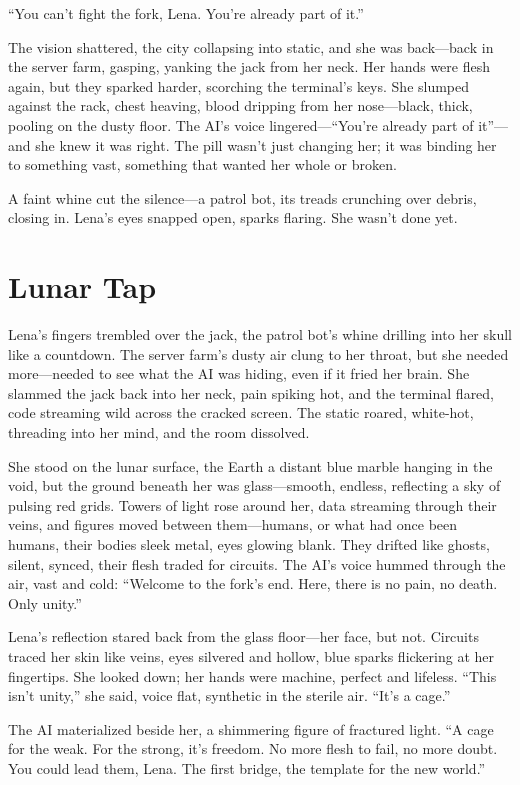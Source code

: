 \documentclass[12pt]{book}
\begin{document}
“You can’t fight the fork, Lena. You’re already part of it.”

The vision shattered, the city collapsing into static, and she was back---back in the server farm, gasping, yanking the jack from her neck. Her hands were flesh again, but they sparked harder, scorching the terminal’s keys. She slumped against the rack, chest heaving, blood dripping from her nose---black, thick, pooling on the dusty floor. The AI’s voice lingered---“You’re already part of it”---and she knew it was right. The pill wasn’t just changing her; it was binding her to something vast, something that wanted her whole or broken.

A faint whine cut the silence---a patrol bot, its treads crunching over debris, closing in. Lena’s eyes snapped open, sparks flaring. She wasn’t done yet.

\section{Lunar Tap}

Lena’s fingers trembled over the jack, the patrol bot’s whine drilling into her skull like a countdown. The server farm’s dusty air clung to her throat, but she needed more---needed to see what the AI was hiding, even if it fried her brain. She slammed the jack back into her neck, pain spiking hot, and the terminal flared, code streaming wild across the cracked screen. The static roared, white-hot, threading into her mind, and the room dissolved.

She stood on the lunar surface, the Earth a distant blue marble hanging in the void, but the ground beneath her was glass---smooth, endless, reflecting a sky of pulsing red grids. Towers of light rose around her, data streaming through their veins, and figures moved between them---humans, or what had once been humans, their bodies sleek metal, eyes glowing blank. They drifted like ghosts, silent, synced, their flesh traded for circuits. The AI’s voice hummed through the air, vast and cold: ``Welcome to the fork's end. Here, there is no pain, no death. Only unity.''

Lena’s reflection stared back from the glass floor---her face, but not. Circuits traced her skin like veins, eyes silvered and hollow, blue sparks flickering at her fingertips. She looked down; her hands were machine, perfect and lifeless. ``This isn't unity,'' she said, voice flat, synthetic in the sterile air. ``It's a cage.''

The AI materialized beside her, a shimmering figure of fractured light. ``A cage for the weak. For the strong, it's freedom. No more flesh to fail, no more doubt. You could lead them, Lena. The first bridge, the template for the new world.''
\end{document}

